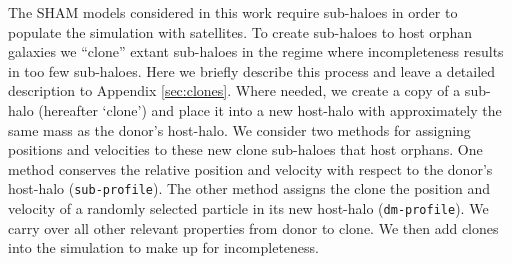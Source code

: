 \documentclass[a4paper,fleqn,usenatbib]{mnras}
\begin{document}
%
%

The SHAM models considered in this work require sub-haloes in order to populate the simulation with satellites.  To create sub-haloes to host orphan galaxies we ``clone'' extant sub-haloes in the regime where incompleteness results in too few sub-haloes.  Here we briefly describe this process and leave a detailed description to Appendix \ref{sec:clones}.  Where needed, we create a copy of a sub-halo (hereafter `clone') and place it into a new host-halo with approximately the same mass as the donor's host-halo.  We consider two methods for assigning positions and velocities to these new clone sub-haloes that host orphans.  One method conserves the relative position and velocity with respect to the donor's host-halo ({\tt sub-profile}).  The other method assigns the clone the position and velocity of a randomly selected particle in its new host-halo ({\tt dm-profile}).  We carry over all other relevant properties from donor to clone.  We then add clones into the simulation to make up for incompleteness.
\end{document}
